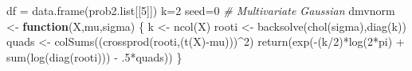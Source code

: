 \documentclass[
  11pt,
]{article}
\newenvironment{Shaded}{\begin{snugshade}}{\end{snugshade}}
\newcommand{\CommentTok}[1]{\textcolor[rgb]{0.56,0.35,0.01}{\textit{#1}}}
\newcommand{\ControlFlowTok}[1]{\textcolor[rgb]{0.13,0.29,0.53}{\textbf{#1}}}
\newcommand{\DecValTok}[1]{\textcolor[rgb]{0.00,0.00,0.81}{#1}}
\newcommand{\FunctionTok}[1]{\textcolor[rgb]{0.00,0.00,0.00}{#1}}
\newcommand{\NormalTok}[1]{#1}
\newcommand{\OtherTok}[1]{\textcolor[rgb]{0.56,0.35,0.01}{#1}}
\newcommand{\SpecialCharTok}[1]{\textcolor[rgb]{0.00,0.00,0.00}{#1}}
\begin{document}
\begin{Shaded}
\begin{Highlighting}[]
\NormalTok{df }\OtherTok{=} \FunctionTok{data.frame}\NormalTok{(prob2.list[[}\DecValTok{5}\NormalTok{]])}
\NormalTok{k}\OtherTok{=}\DecValTok{2}
\NormalTok{seed}\OtherTok{=}\DecValTok{0}
\CommentTok{\# Multivariate Gaussian}
\NormalTok{dmvnorm }\OtherTok{\textless{}{-}} \ControlFlowTok{function}\NormalTok{(X,mu,sigma) \{}
\NormalTok{    k }\OtherTok{\textless{}{-}} \FunctionTok{ncol}\NormalTok{(X)}
\NormalTok{    rooti }\OtherTok{\textless{}{-}} \FunctionTok{backsolve}\NormalTok{(}\FunctionTok{chol}\NormalTok{(sigma),}\FunctionTok{diag}\NormalTok{(k))}
\NormalTok{    quads }\OtherTok{\textless{}{-}} \FunctionTok{colSums}\NormalTok{((}\FunctionTok{crossprod}\NormalTok{(rooti,(}\FunctionTok{t}\NormalTok{(X)}\SpecialCharTok{{-}}\NormalTok{mu)))}\SpecialCharTok{\^{}}\DecValTok{2}\NormalTok{)}
    \FunctionTok{return}\NormalTok{(}\FunctionTok{exp}\NormalTok{(}\SpecialCharTok{{-}}\NormalTok{(k}\SpecialCharTok{/}\DecValTok{2}\NormalTok{)}\SpecialCharTok{*}\FunctionTok{log}\NormalTok{(}\DecValTok{2}\SpecialCharTok{*}\NormalTok{pi) }\SpecialCharTok{+} \FunctionTok{sum}\NormalTok{(}\FunctionTok{log}\NormalTok{(}\FunctionTok{diag}\NormalTok{(rooti))) }\SpecialCharTok{{-}}\NormalTok{ .}\DecValTok{5}\SpecialCharTok{*}\NormalTok{quads))}
\NormalTok{\}}



\end{Highlighting}
\end{Shaded}
\end{document}
